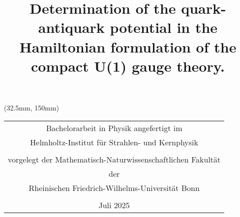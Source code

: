\documentclass[sn-mathphys-num,iicol]{sn-jnl}
\theoremstyle{thmstyleone}
\theoremstyle{thmstyletwo}
\theoremstyle{thmstylethree}
\begin{document}
\title[]{Determination of the quark-antiquark potential in the Hamiltonian formulation of the compact U(1) gauge theory.}
\author*[1]{ }

\maketitle
\begingroup
\renewcommand{\arraystretch}{1.8}
\begin{textblock*}{140mm}(32.5mm, 150mm)
	\begin{center}
		\begin{tabular}{c}
			\large{Bachelorarbeit in Physik angefertigt im}                     \\
			\large{Helmholtz-Institut für Strahlen- und Kernphysik}             \\
			\\
			\large{vorgelegt der Mathematisch-Naturwissenschaftlichen Fakultät} \\
			\large{der}                                                         \\
			\large{Rheinischen Friedrich-Wilhelms-Universität Bonn}             \\
			\\
			\large{Juli 2025}
		\end{tabular}
	\end{center}
\end{textblock*}
\endgroup

\clearpage
{}

\clearpage







\clearpage

\end{document}
